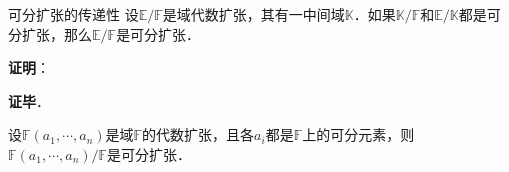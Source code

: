 
















\begin{corollary}{可分扩张的传递性}\label{SprbE2_cor1}
设$\mathbb{E}/\mathbb{F}$是域代数扩张，其有一中间域$\mathbb{K}$．如果$\mathbb{K}/\mathbb{F}$和$\mathbb{E}/\mathbb{K}$都是可分扩张，那么$\mathbb{E}/\mathbb{F}$是可分扩张．
\end{corollary}

\textbf{证明}：










\textbf{证毕}．





\begin{corollary}{}
设$\mathbb{F}(a_1, \cdots, a_n)$是域$\mathbb{F}$的代数扩张，且各$a_i$都是$\mathbb{F}$上的可分元素，则$\mathbb{F}(a_1, \cdots, a_n)/\mathbb{F}$是可分扩张．
\end{corollary}



















